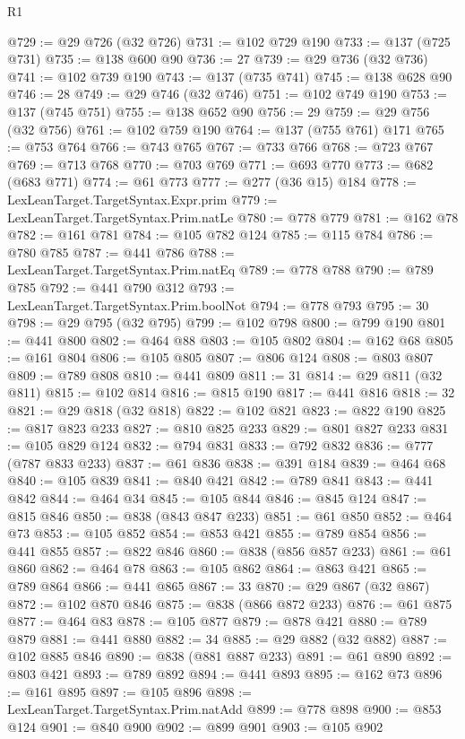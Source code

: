 \begin{lexlean}{R1}
\begin{coremodule}
{{{{{{{{{{{{{{{{{{{{{{{{{{{{{{{{{{{{{{{{{{{{{{{{{{{{{{{{{{{{{{{{{{{{{{{{{{{{{{{{{{{{{{{{{{@729 := @29 @726 (@32 @726)
@731 := @102 @729 @190
@733 := @137 (@725 @731)
@735 := @138 @600 @90
@736 := 27
@739 := @29 @736 (@32 @736)
@741 := @102 @739 @190
@743 := @137 (@735 @741)
@745 := @138 @628 @90
@746 := 28
@749 := @29 @746 (@32 @746)
@751 := @102 @749 @190
@753 := @137 (@745 @751)
@755 := @138 @652 @90
@756 := 29
@759 := @29 @756 (@32 @756)
@761 := @102 @759 @190
@764 := @137 (@755 @761) @171
@765 := @753 @764
@766 := @743 @765
@767 := @733 @766
@768 := @723 @767
@769 := @713 @768
@770 := @703 @769
@771 := @693 @770
@773 := @682 (@683 @771)
@774 := @61 @773
@777 := @277 (@36 @15) @184
@778 := LexLeanTarget.TargetSyntax.Expr.prim
@779 := LexLeanTarget.TargetSyntax.Prim.natLe
@780 := @778 @779
@781 := @162 @78
@782 := @161 @781
@784 := @105 @782 @124
@785 := @115 @784
@786 := @780 @785
@787 := @441 @786
@788 := LexLeanTarget.TargetSyntax.Prim.natEq
@789 := @778 @788
@790 := @789 @785
@792 := @441 @790 @312
@793 := LexLeanTarget.TargetSyntax.Prim.boolNot
@794 := @778 @793
@795 := 30
@798 := @29 @795 (@32 @795)
@799 := @102 @798
@800 := @799 @190
@801 := @441 @800
@802 := @464 @88
@803 := @105 @802
@804 := @162 @68
@805 := @161 @804
@806 := @105 @805
@807 := @806 @124
@808 := @803 @807
@809 := @789 @808
@810 := @441 @809
@811 := 31
@814 := @29 @811 (@32 @811)
@815 := @102 @814
@816 := @815 @190
@817 := @441 @816
@818 := 32
@821 := @29 @818 (@32 @818)
@822 := @102 @821
@823 := @822 @190
@825 := @817 @823 @233
@827 := @810 @825 @233
@829 := @801 @827 @233
@831 := @105 @829 @124
@832 := @794 @831
@833 := @792 @832
@836 := @777 (@787 @833 @233)
@837 := @61 @836
@838 := @391 @184
@839 := @464 @68
@840 := @105 @839
@841 := @840 @421
@842 := @789 @841
@843 := @441 @842
@844 := @464 @34
@845 := @105 @844
@846 := @845 @124
@847 := @815 @846
@850 := @838 (@843 @847 @233)
@851 := @61 @850
@852 := @464 @73
@853 := @105 @852
@854 := @853 @421
@855 := @789 @854
@856 := @441 @855
@857 := @822 @846
@860 := @838 (@856 @857 @233)
@861 := @61 @860
@862 := @464 @78
@863 := @105 @862
@864 := @863 @421
@865 := @789 @864
@866 := @441 @865
@867 := 33
@870 := @29 @867 (@32 @867)
@872 := @102 @870 @846
@875 := @838 (@866 @872 @233)
@876 := @61 @875
@877 := @464 @83
@878 := @105 @877
@879 := @878 @421
@880 := @789 @879
@881 := @441 @880
@882 := 34
@885 := @29 @882 (@32 @882)
@887 := @102 @885 @846
@890 := @838 (@881 @887 @233)
@891 := @61 @890
@892 := @803 @421
@893 := @789 @892
@894 := @441 @893
@895 := @162 @73
@896 := @161 @895
@897 := @105 @896
@898 := LexLeanTarget.TargetSyntax.Prim.natAdd
@899 := @778 @898
@900 := @853 @124
@901 := @840 @900
@902 := @899 @901
@903 := @105 @902
}}}}}}}}}}}}}}}}}}}}}}}}}}}}}}}}}}}}}}}}}}}}}}}}}}}}}}}}}}}}}}}}}}}}}}}}}}}}}}}}}}}}}}}}}}
\end{coremodule}
\end{lexlean}
